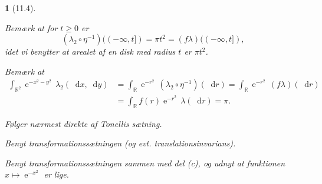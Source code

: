 \documentclass[a4paper, 11pt, article, danish, oneside]{memoir}
\title{\doctitle}
\author{\docauthor}
\newcommand{\reals}{\mathbb{R}}
\newcommand{\dif}{\mathop{}\!\mathrm{d}}
\DeclareMathOperator{\e}{\mathrm{e}}
\newcommand\inv{^{-1}}
\newcommand{\pencilsymbol}{\raisebox{-2pt}{\normalfont\PencilLeft}}
\theoremstyle{changedotcustomnumber}
\theoremstyle{changedotbreakcustomnumber}
\newtheorem{opgavebreak}{\pencilsymbol}
\begin{document}
\maketitle


\begin{opgavebreak}[11.4]
\begin{solutionsec}
    \item Bemærk at for $t \geq 0$ er
    \begin{equation*}
        (\lambda_2 \circ \eta\inv)((-\infty,t])
            = \pi t^2
            = (f\lambda)((-\infty,t]),
    \end{equation*}
    idet vi benytter at arealet af en disk med radius $t$ er $\pi t^2$.

    \item Bemærk at
    \begin{align*}
        \int_{\reals^2} \e^{-x^2-y^2} \,\lambda_2(\dif x, \dif y)
            &= \int_\reals \e^{-r^2} \, (\lambda_2 \circ \eta\inv)(\dif r)
             = \int_\reals \e^{-r^2} \, (f\lambda)(\dif r) \\
            &= \int_\reals f(r) \e^{-r^2} \,\lambda(\dif r)
             = \pi.
    \end{align*}

    \item Følger nærmest direkte af Tonellis sætning.
    
    \item Benyt transformationssætningen (og evt. translationsinvarians).

    \item Benyt transformationssætningen sammen med del (c), og udnyt at funktionen $x \mapsto \e^{-x^2}$ er lige.
\end{solutionsec}
\end{opgavebreak}
\end{document}
